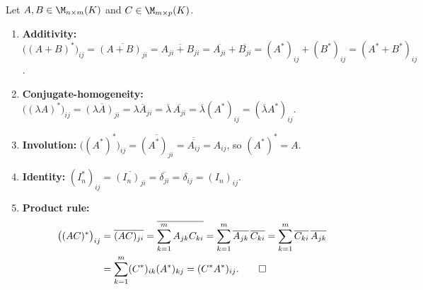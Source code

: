 \begin{exercisesolution}
\label{sol:properties_adjoint_matrix_rules}
Let $A, B \in \M_{n \times m}(K)$ and $C \in \M_{m \times p}(K)$.
\begin{enumerate}[label=\textbf{(\alph*)}]
    \item \textbf{Additivity:}
    $\big((A + B)^*\big)_{ij} = \overline{(A + B)_{ji}} = \overline{A_{ji} + B_{ji}} = \overline{A_{ji}} + \overline{B_{ji}} = (A^*)_{ij} + (B^*)_{ij} = (A^* + B^*)_{ij}$.

    \item \textbf{Conjugate-homogeneity:}
    $\big((\lambda A)^*\big)_{ij} = \overline{(\lambda A)_{ji}} = \overline{\lambda A_{ji}} = \overline{\lambda} \, \overline{A_{ji}} = \overline{\lambda} (A^*)_{ij} = (\overline{\lambda} A^*)_{ij}$.

    \item \textbf{Involution:}
    $\big((A^*)^*\big)_{ij} = \overline{(A^*)_{ji}} = \overline{\overline{A_{ij}}} = A_{ij}$, so $(A^*)^* = A$.

    \item \textbf{Identity:}
    $(I_n^*)_{ij} = \overline{(I_n)_{ji}} = \overline{\delta_{ji}} = \delta_{ij} = (I_n)_{ij}$.

    \item \textbf{Product rule:}
    \begin{align*}
    \big((A C)^*\big)_{ij} &= \overline{(A C)_{ji}} = \overline{\sum_{k=1}^m A_{jk} C_{ki}} = \sum_{k=1}^m \overline{A_{jk}} \, \overline{C_{ki}} = \sum_{k=1}^m \overline{C_{ki}} \, \overline{A_{jk}} \\
    &= \sum_{k=1}^m (C^*)_{ik} (A^*)_{kj} = (C^* A^*)_{ij}. \qedhere
    \end{align*}
\end{enumerate}
\end{exercisesolution}

